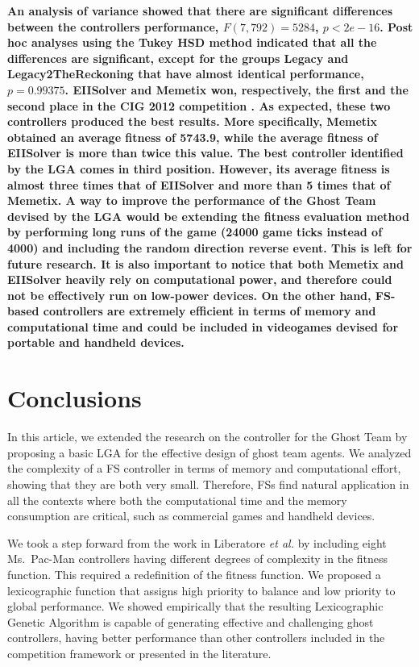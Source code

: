 \documentclass[journal]{IEEEtran}
\begin{document}
\textbf{An analysis of variance showed that there are significant differences between the controllers performance, $F(7,792) = 5284$, $p <2e-16$. Post hoc analyses using the Tukey HSD method indicated that all the differences are significant, except for the groups Legacy and Legacy2TheReckoning that have almost identical performance, $p = 0.99375$.
EIISolver and Memetix won, respectively, the first and the second place in the CIG 2012 competition \cite{CompetitionURL}. As expected, these two controllers produced the best results. More specifically, Memetix obtained an average fitness of 5743.9, while the average fitness of EIISolver is more than twice this value.
The best controller identified by the LGA comes in third position. However, its average fitness is almost three times that of EIISolver and more than 5 times that of Memetix. A way to improve the performance of the Ghost Team devised by the LGA would be extending the fitness evaluation method by performing long runs of the game (24000 game ticks instead of 4000) and including the random direction reverse event. This is left for future research. It is also important to notice that both Memetix and EIISolver heavily rely on computational power, and therefore could not be effectively run on low-power devices. On the other hand, FS-based controllers are extremely efficient in terms of memory and computational time and could be included in videogames devised for portable and handheld devices.}

\section{Conclusions}
\label{sec:Conclusions}
In this article, we extended the research on the controller for the
Ghost Team by proposing a basic LGA for the effective design of ghost team agents. We analyzed the complexity of a FS controller in terms of memory and computational effort, showing that they are both very small. Therefore, FSs find natural application in all the contexts where both the computational time and the memory consumption are critical, such as commercial games and handheld devices.

We took a step forward from the work in Liberatore \emph{et al.} \cite{Liberatore2014} by including eight Ms.\  Pac-Man controllers having different degrees of complexity in the fitness function. This required a redefinition of the fitness function. We proposed a lexicographic function that assigns high priority to balance and low priority to global performance. We showed empirically that the resulting Lexicographic Genetic Algorithm is capable of generating effective and challenging ghost controllers, having better performance than other controllers included in the competition framework or presented in the literature.
\end{document}
